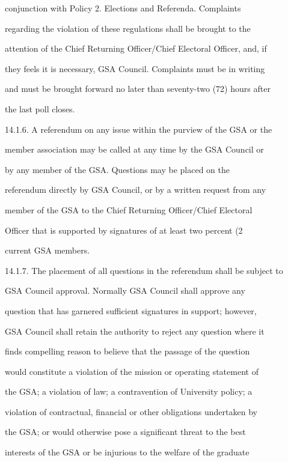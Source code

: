 \documentclass{article}
\begin{document}
conjunction   with   Policy   2.   Elections   and   Referenda.   Complaints  

regarding  the  violation  of  these  regulations  shall  be  brought  to  the  

attention of the Chief Returning Officer/Chief Electoral Officer, and, if  

they feels it is necessary, GSA Council. Complaints must be in writing  

and must be brought forward no later than seventy-two (72) hours after  

the last poll closes.  



14.1.6.     A referendum on any issue within the purview of the GSA or the  

member association may be called at any time by the GSA  Council or  

by   any   member   of   the   GSA.   Questions   may   be   placed   on   the  

referendum directly by GSA Council, or by a written request from any  

member  of  the  GSA  to  the  Chief  Returning  Officer/Chief  Electoral  

Officer that is supported by signatures of at least two percent (2%

current GSA members.  



14.1.7.     The placement of all questions in the referendum shall be subject to  

GSA  Council  approval.  Normally  GSA  Council  shall  approve  any  

question  that  has  garnered  sufficient  signatures  in  support;  however,  

GSA  Council shall retain the authority to reject any question where it  

finds  compelling  reason  to  believe  that  the  passage  of  the  question  

would constitute a violation of the mission or operating statement of  

the  GSA;  a  violation  of  law;  a  contravention  of  University  policy;  a  

violation  of  contractual,  financial  or  other  obligations  undertaken  by  

the  GSA;  or  would  otherwise  pose  a  significant  threat  to  the  best  

interests  of  the  GSA  or  be  injurious  to  the  welfare  of  the  graduate  
\end{document}

